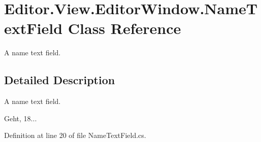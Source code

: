 \section{Editor.\-View.\-Editor\-Window.\-Name\-Text\-Field Class Reference}
\label{class_editor_1_1_view_1_1_editor_window_1_1_name_text_field}


A name text field.  




\subsection{Detailed Description}
A name text field. 

Geht, 18... 

Definition at line 20 of file Name\-Text\-Field.\-cs.

